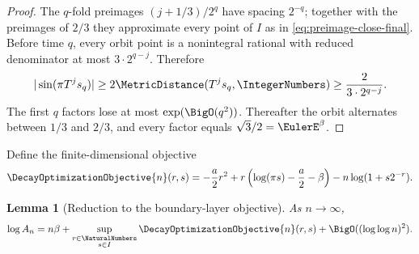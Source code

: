 \documentclass[11pt,oneside]{article}
\numberwithin{equation}{section}
\newtheorem{lemma}[theorem]{Lemma}
\theoremstyle{definition}
\theoremstyle{remark}
\begin{document}
\begin{proof}
The $q$-fold preimages $(j+1/3)/2^q$ have spacing $2^{-q}$; together with the preimages of
$2/3$ they approximate every point of $I$ as in \eqref{eq:preimage-close-final}.  Before
time $q$, every orbit point is a nonintegral rational with reduced denominator at most
$3\cdot2^{q-j}$.  Therefore
\[
 |\sin(\pi T^js_q)|\ge2\MetricDistance(T^js_q,\IntegerNumbers)
 \ge\frac{2}{3\cdot2^{q-j}}.
\]
The first $q$ factors lose at most $\exp(\BigO(q^2))$.  Thereafter the orbit alternates between
$1/3$ and $2/3$, and every factor equals $\sqrt3/2=\EulerE^\beta$.
\end{proof}

Define the finite-dimensional objective
\begin{equation}
 \DecayOptimizationObjective{n}(r,s)
 =-\frac a2r^2+r\left(\log(\pi s)-\frac a2-\beta\right)
 -n\log(1+s2^{-r}).
 \label{eq:Fn-final}
\end{equation}

\begin{lemma}[Reduction to the boundary-layer objective]
\label{lem:An-reduction-final}
As $n\to\infty$,
\begin{equation}
 \log A_n=n\beta+
 \sup_{\substack{r\in\NaturalNumbers\\s\in I}}\DecayOptimizationObjective{n}(r,s)
 +\BigO((\log\log n)^2).
 \label{eq:An-reduction-final}
\end{equation}
\end{lemma}
\end{document}
